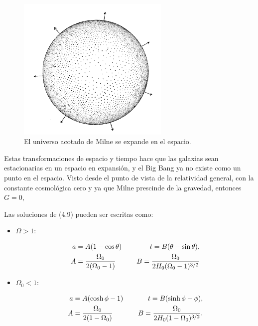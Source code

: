 \documentclass[11pt]{article}
\begin{document}
{   \begin{figure}                  \includegraphics[width=0.65\textwidth]{milne_model.png}
        \caption{\footnotesize{El universo acotado de Milne se expande en el espacio.}}
    \end{figure}

 
Estas transformaciones de espacio y tiempo hace que las galaxias sean estacionarias en un espacio en expansión, y el Big Bang ya no existe como un punto en el espacio. Visto desde el punto de vista de la relatividad general, con la constante cosmológica cero y ya que Milne prescinde de la gravedad, entonces $G =0$, 

         \vspace{5cm}


    Las soluciones de (4.9) pueden ser escritas como: 
    
 

    
   \begin{itemize}

     \item $\Omega > 1$: 

        \begin{align}
            a & =A (1 - \cos \theta) \hspace{0.4cm} & t  = B(\theta - \sin \theta), \\
             A & = \frac{\Omega_0}{2(\Omega_0 -1 )} \hspace{0.4cm} & B  = \frac{\Omega_0}{2H_0( \Omega_0 - 1)^{3/2}}
        \end{align}
        
    \item $\Omega_0 <1$:

        \begin{align}
	        a & =A (\cosh \phi - 1) \hspace{0.4cm} &t = B(\sinh \phi - \phi ), \\
	        A & = \frac{\Omega_0}{2(1 - \Omega_0 )} \hspace{0.4cm} & B= \frac{\Omega_0}{2H_0(1 - \Omega_0)^{3/2}}.
        \end{align}


\end{itemize}}
\end{document}
